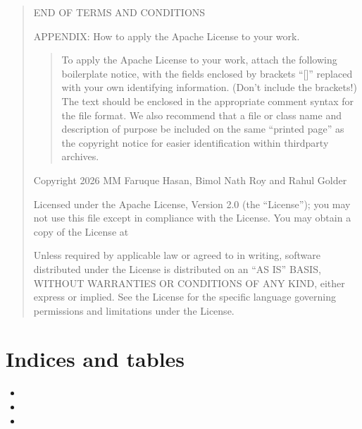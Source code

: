 \documentclass[letterpaper,10pt,english,openany,oneside]{sphinxmanual}
\begin{document}
\begin{quote}
\begin{enumerate}
\end{enumerate}

\sphinxAtStartPar
END OF TERMS AND CONDITIONS

\sphinxAtStartPar
APPENDIX: How to apply the Apache License to your work.
\begin{quote}

\sphinxAtStartPar
To apply the Apache License to your work, attach the following
boilerplate notice, with the fields enclosed by brackets “{[}{]}”
replaced with your own identifying information. (Don’t include
the brackets!)  The text should be enclosed in the appropriate
comment syntax for the file format. We also recommend that a
file or class name and description of purpose be included on the
same “printed page” as the copyright notice for easier
identification within third\sphinxhyphen{}party archives.
\end{quote}

\sphinxAtStartPar
Copyright 2026 MM Faruque Hasan, Bimol Nath Roy and Rahul Golder

\sphinxAtStartPar
Licensed under the Apache License, Version 2.0 (the “License”);
you may not use this file except in compliance with the License.
You may obtain a copy of the License at
\begin{quote}

\sphinxAtStartPar
{}
\end{quote}

\sphinxAtStartPar
Unless required by applicable law or agreed to in writing, software
distributed under the License is distributed on an “AS IS” BASIS,
WITHOUT WARRANTIES OR CONDITIONS OF ANY KIND, either express or implied.
See the License for the specific language governing permissions and
limitations under the License.
\end{quote}




\chapter{Indices and tables}
\label{\detokenize{index:indices-and-tables}}\begin{itemize}
\item {} 
\sphinxAtStartPar
{}

\item {} 
\sphinxAtStartPar
{}

\item {} 
\sphinxAtStartPar
{}

\end{itemize}
\end{document}
